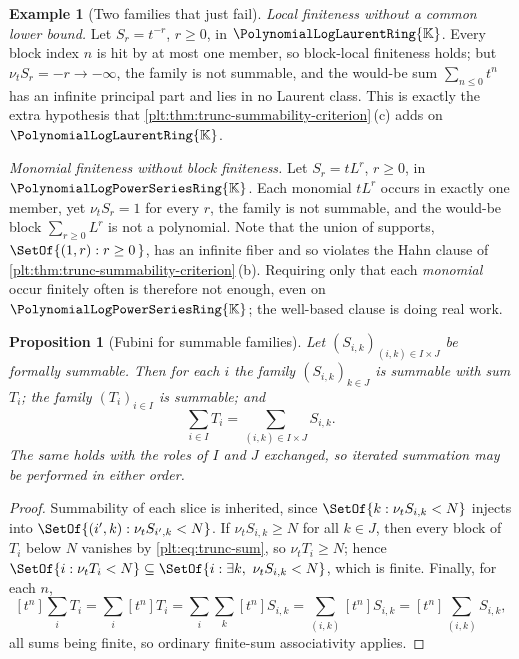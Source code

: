 \documentclass[11pt,oneside]{article}
\theoremstyle{plain}
\newtheorem{proposition}[theorem]{Proposition}
\theoremstyle{definition}
\newtheorem{example}[theorem]{Example}
\theoremstyle{remark}
\newcommand{\K}{\mathbb{K}}
\newcommand{\PLpow}{\PolynomialLogPowerSeriesRing{\K}}   %
\newcommand{\PLlau}{\PolynomialLogLaurentRing{\K}}       %
\newcommand{\ordt}{\nu_{t}}                              %
\begin{document}
\begin{example}[Two families that just fail]
\label{plt:ex:trunc-summability-fails}
\emph{Local finiteness without a common lower bound.}  Let \(S_r=t^{-r}\),
\(r\ge0\), in \(\PLlau\).  Every block index \(n\) is hit by at most one
member, so block-local finiteness holds; but \(\ordt S_r=-r\to-\infty\), the
family is not summable, and the would-be sum \(\sum_{n\le0}t^{n}\) has an
infinite principal part and lies in no Laurent class.  This is exactly the
extra hypothesis that \cref{plt:thm:trunc-summability-criterion}\,(c) adds on
\(\PLlau\).

\emph{Monomial finiteness without block finiteness.}  Let \(S_r=tL^r\),
\(r\ge0\), in \(\PLpow\).  Each monomial \(tL^r\) occurs in exactly one
member, yet \(\ordt S_r=1\) for every \(r\), the family is not summable, and
the would-be block \(\sum_{r\ge0}L^r\) is not a polynomial.  Note that the
union of supports, \(\SetOf{(1,r):r\ge0\,}\), has an infinite fiber and so
violates the Hahn clause of
\cref{plt:thm:trunc-summability-criterion}\,(b).  Requiring only that each
\emph{monomial} occur finitely often is therefore not enough, even on
\(\PLpow\); the well-based clause is doing real work.
\end{example}

\begin{proposition}[Fubini for summable families]
\label{plt:prop:trunc-fubini}
Let \((S_{i,k})_{(i,k)\in I\times J}\) be formally summable.  Then for each
\(i\) the family \((S_{i,k})_{k\in J}\) is summable with sum \(T_i\); the
family \((T_i)_{i\in I}\) is summable; and
\[
  \sum_{i\in I}T_i=\sum_{(i,k)\in I\times J}S_{i,k}.
\]
The same holds with the roles of \(I\) and \(J\) exchanged, so iterated
summation may be performed in either order.
\end{proposition}

\begin{proof}
Summability of each slice is inherited, since
\(\SetOf{k:\ordt S_{i,k}<N}\) injects into
\(\SetOf{(i',k):\ordt S_{i',k}<N}\).  If \(\ordt S_{i,k}\ge N\) for all
\(k\in J\), then every block of \(T_i\) below \(N\) vanishes by
\eqref{plt:eq:trunc-sum}, so \(\ordt T_i\ge N\); hence
\(\SetOf{i:\ordt T_i<N}\subseteq\SetOf{i:\exists k,\ \ordt S_{i,k}<N}\), which
is finite.  Finally, for each \(n\),
\[
  [t^n]\sum_iT_i=\sum_i[t^n]T_i=\sum_i\sum_k[t^n]S_{i,k}
  =\sum_{(i,k)}[t^n]S_{i,k}=[t^n]\sum_{(i,k)}S_{i,k},
\]
all sums being finite, so ordinary finite-sum associativity applies.
\end{proof}
\end{document}
